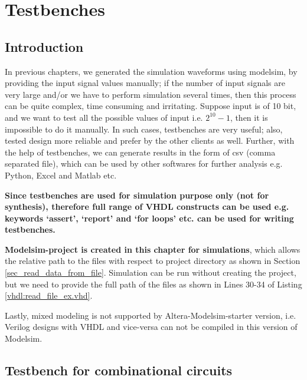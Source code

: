 \chapter{Testbenches} \label{ch:Testbench}

\graphicspath{{Chapters/Testbench/Figures/}}


%

\section{Introduction}

In previous chapters, we generated the simulation waveforms using modelsim, by providing the input signal values manually; if the number of input signals are very large and/or we have to perform simulation several times, then this process can be quite complex, time consuming and irritating. Suppose input is of 10 bit, and we want to test all the possible values of input i.e. $2^{10}-1$, then it is impossible to do it manually. In such cases, testbenches are very useful; also, tested design more reliable and prefer by the other clients as well. Further, with the help of testbenches, we can generate results in the form of csv (comma separated file), which can be used by other softwares for further analysis e.g. Python, Excel and Matlab etc.  

\textbf{Since testbenches are used for simulation purpose only (not for synthesis), therefore full range of VHDL constructs can be used e.g. keywords `assert', `report' and `for loops' etc. can be used for writing testbenches.}

\textbf{Modelsim-project is created in this chapter for simulations}, which allows the relative path to the files with respect to project directory as shown in Section \ref{sec_read_data_from_file}. Simulation can be run without creating the project, but we need to provide the full path of the files as shown in Lines 30-34 of Listing \ref{vhdl:read_file_ex.vhd}. 

Lastly, mixed modeling is not supported by Altera-Modelsim-starter version, i.e. Verilog designs with VHDL and vice-versa can not be compiled in this version of Modelsim. 

\section{Testbench for combinational circuits}

